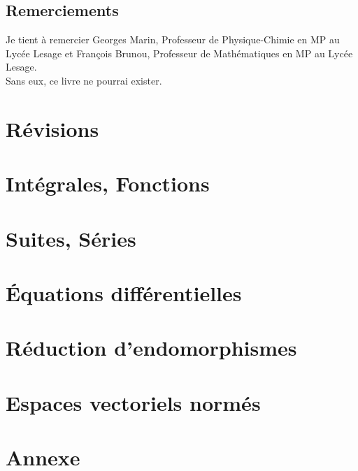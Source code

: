 \documentclass[a4paper, titlepage ,twoside]{book}
\begin{document}
\chapter{Remerciements}
Je tient à remercier Georges Marin, Professeur de Physique-Chimie en MP au Lycée Lesage et François Brunou, Professeur de Mathématiques en MP au Lycée Lesage.\\
Sans eux, ce livre ne pourrai exister.\\
\mainmatter                   %
\part{Révisions}

\part{Intégrales, Fonctions}
\setcounter{chapter}{0}



\part{Suites, Séries}
\setcounter{chapter}{0}







\part{Équations différentielles}
\setcounter{chapter}{0}

\part{Réduction d'endomorphismes}
\setcounter{chapter}{0}


\part{Espaces vectoriels normés}
\setcounter{chapter}{0}






\appendix                     %
\part{Annexe}





\backmatter
\tableofcontents            %
\end{document}
